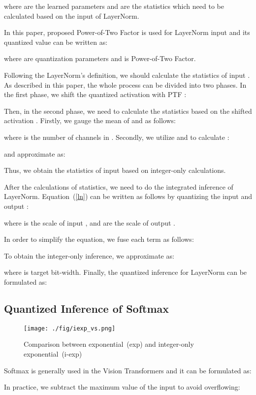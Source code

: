 \documentclass{article}
\begin{document}
where  are the learned parameters and  are the statistics which need to be calculated based on the input of LayerNorm.


In this paper, proposed Power-of-Two Factor is used for LayerNorm input  and its quantized value  can be written as:


where  are quantization parameters and  is Power-of-Two Factor.

Following the LayerNorm's definition, we should calculate the statistics of input . As described in this paper, the whole process can be divided into two phases. In the first phase, we shift the quantized activation  with PTF :

Then, in the second phase, we need to calculate the statistics based on the shifted activation . Firstly, we gauge the mean of  and  as follows:

where  is the number of channels in .
Secondly, we utilize  and  to calculate :

and approximate  as:


Thus, we obtain the statistics of input  based on integer-only calculations.


After the calculations of statistics, we need to do the integrated inference of LayerNorm.
Equation~(\ref{ln}) can be written as follows by quantizing the input  and output :

where  is the scale of input , and  are the scale of output .

In order to simplify the equation, we fuse each term as follows:

To obtain the integer-only inference, we approximate  as:


where  is target bit-width.
Finally, the quantized inference for LayerNorm can be formulated as:



\subsection{Quantized Inference of Softmax}
\begin{figure}[t]
    \centering
    \texttt{[image: ./fig/iexp\_vs.png]}
    \caption{Comparison between exponential~(exp) and integer-only exponential~(i-exp)}
    \label{iexp_vs}
\end{figure}
Softmax is generally used in the Vision Transformers and it can be formulated as:


In practice, we subtract the maximum value of the input to avoid overflowing:
\end{document}
